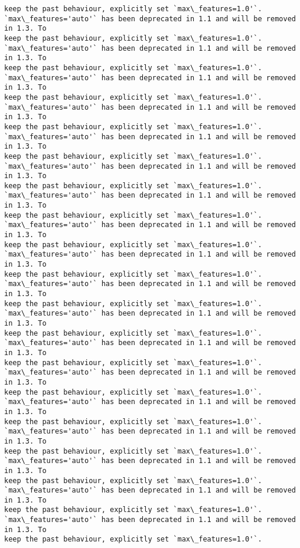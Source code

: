 \documentclass[11pt]{article}
\begin{document}
\begin{Verbatim}[commandchars=\\\{\}]
keep the past behaviour, explicitly set `max\_features=1.0'`.
`max\_features='auto'` has been deprecated in 1.1 and will be removed in 1.3. To
keep the past behaviour, explicitly set `max\_features=1.0'`.
`max\_features='auto'` has been deprecated in 1.1 and will be removed in 1.3. To
keep the past behaviour, explicitly set `max\_features=1.0'`.
`max\_features='auto'` has been deprecated in 1.1 and will be removed in 1.3. To
keep the past behaviour, explicitly set `max\_features=1.0'`.
`max\_features='auto'` has been deprecated in 1.1 and will be removed in 1.3. To
keep the past behaviour, explicitly set `max\_features=1.0'`.
`max\_features='auto'` has been deprecated in 1.1 and will be removed in 1.3. To
keep the past behaviour, explicitly set `max\_features=1.0'`.
`max\_features='auto'` has been deprecated in 1.1 and will be removed in 1.3. To
keep the past behaviour, explicitly set `max\_features=1.0'`.
`max\_features='auto'` has been deprecated in 1.1 and will be removed in 1.3. To
keep the past behaviour, explicitly set `max\_features=1.0'`.
`max\_features='auto'` has been deprecated in 1.1 and will be removed in 1.3. To
keep the past behaviour, explicitly set `max\_features=1.0'`.
`max\_features='auto'` has been deprecated in 1.1 and will be removed in 1.3. To
keep the past behaviour, explicitly set `max\_features=1.0'`.
`max\_features='auto'` has been deprecated in 1.1 and will be removed in 1.3. To
keep the past behaviour, explicitly set `max\_features=1.0'`.
`max\_features='auto'` has been deprecated in 1.1 and will be removed in 1.3. To
keep the past behaviour, explicitly set `max\_features=1.0'`.
`max\_features='auto'` has been deprecated in 1.1 and will be removed in 1.3. To
keep the past behaviour, explicitly set `max\_features=1.0'`.
`max\_features='auto'` has been deprecated in 1.1 and will be removed in 1.3. To
keep the past behaviour, explicitly set `max\_features=1.0'`.
`max\_features='auto'` has been deprecated in 1.1 and will be removed in 1.3. To
keep the past behaviour, explicitly set `max\_features=1.0'`.
`max\_features='auto'` has been deprecated in 1.1 and will be removed in 1.3. To
keep the past behaviour, explicitly set `max\_features=1.0'`.
`max\_features='auto'` has been deprecated in 1.1 and will be removed in 1.3. To
keep the past behaviour, explicitly set `max\_features=1.0'`.
`max\_features='auto'` has been deprecated in 1.1 and will be removed in 1.3. To
keep the past behaviour, explicitly set `max\_features=1.0'`.
`max\_features='auto'` has been deprecated in 1.1 and will be removed in 1.3. To
keep the past behaviour, explicitly set `max\_features=1.0'`.

\end{Verbatim}
\end{document}
